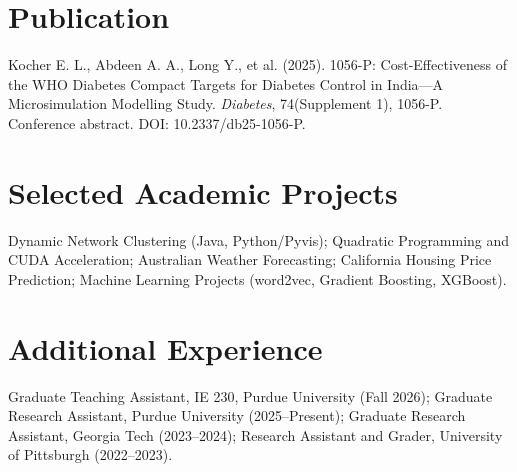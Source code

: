 \documentclass[letterpaper,10pt]{article}
\begin{document}
\section{Publication}
Kocher E. L., Abdeen A. A., Long Y., et al. (2025). 1056-P: Cost-Effectiveness of the WHO Diabetes Compact Targets for Diabetes Control in India---A Microsimulation Modelling Study. \textit{Diabetes}, 74(Supplement 1), 1056-P. Conference abstract. DOI: 10.2337/db25-1056-P.
\section{Selected Academic Projects}
Dynamic Network Clustering (Java, Python/Pyvis); Quadratic Programming and CUDA Acceleration; Australian Weather Forecasting; California Housing Price Prediction; Machine Learning Projects (word2vec, Gradient Boosting, XGBoost).
\section{Additional Experience}
Graduate Teaching Assistant, IE 230, Purdue University (Fall 2026); Graduate Research Assistant, Purdue University (2025--Present); Graduate Research Assistant, Georgia Tech (2023--2024); Research Assistant and Grader, University of Pittsburgh (2022--2023).
\end{document}

